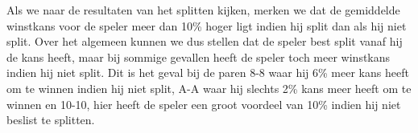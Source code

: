 \documentclass[11pt, final, journal, a4paper]{IEEEtran}
\begin{document}
Als we naar de resultaten van het splitten kijken, merken we dat de gemiddelde winstkans voor de speler meer dan 10\% hoger ligt indien hij split dan als hij niet split. Over het algemeen kunnen we dus stellen dat de speler best split vanaf hij de kans heeft, maar bij sommige gevallen heeft de speler toch meer winstkans indien hij niet split. Dit is het geval bij de paren 8-8 waar hij 6\% meer kans heeft om te winnen indien hij niet split, A-A waar hij slechts 2\% kans meer heeft om te winnen en 10-10, hier heeft de speler een groot voordeel van 10\% indien hij niet beslist te splitten.




\end{document}
